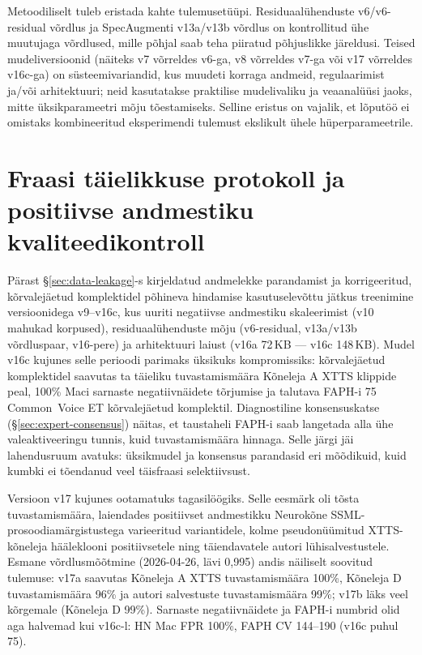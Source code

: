 Metoodiliselt tuleb eristada kahte tulemusetüüpi. Residuaalühenduste v6/v6-residual võrdlus ja SpecAugmenti v13a/v13b võrdlus on kontrollitud ühe muutujaga võrdlused, mille põhjal saab teha piiratud põhjuslikke järeldusi. Teised mudeliversioonid (näiteks v7 võrreldes v6-ga, v8 võrreldes v7-ga või v17 võrreldes v16c-ga) on süsteemivariandid, kus muudeti korraga andmeid, regulaarimist ja/või arhitektuuri; neid kasutatakse praktilise mudelivaliku ja veaanalüüsi jaoks, mitte üksikparameetri mõju tõestamiseks. Selline eristus on vajalik, et lõputöö ei omistaks kombineeritud eksperimendi tulemust ekslikult ühele hüperparameetrile.

\section{Fraasi täielikkuse protokoll ja positiivse andmestiku kvaliteedikontroll}
\label{sec:phrase-completeness-control}

Pärast §\ref{sec:data-leakage}-s kirjeldatud andmelekke parandamist ja korrigeeritud, kõrvalejäetud komplektidel põhineva hindamise kasutuselevõttu jätkus treenimine versioonidega v9--v16c, kus uuriti negatiivse andmestiku skaleerimist (v10 mahukad korpused), residuaalühenduste mõju (v6-residual, v13a/v13b võrdluspaar, v16-pere) ja arhitektuuri laiust (v16a 72\,KB --- v16c 148\,KB). Mudel v16c kujunes selle perioodi parimaks üksikuks kompromissiks: kõrvalejäetud komplektidel saavutas ta täieliku tuvastamismäära Kõneleja A XTTS klippide peal, 100\% Maci sarnaste negatiivnäidete tõrjumise ja talutava FAPH-i 75 Common~Voice ET kõrvalejäetud komplektil. Diagnostiline konsensuskatse (§\ref{sec:expert-consensus}) näitas, et taustaheli FAPH-i saab langetada alla ühe valeaktiveeringu tunnis, kuid tuvastamismäära hinnaga. Selle järgi jäi lahendusruum avatuks: üksikmudel ja konsensus parandasid eri mõõdikuid, kuid kumbki ei tõendanud veel täisfraasi selektiivsust.

Versioon v17 kujunes ootamatuks tagasilöögiks. Selle eesmärk oli tõsta tuvastamismäära, laiendades positiivset andmestikku Neurokõne SSML-prosoodiamärgistustega varieeritud variantidele, kolme pseudonüümitud XTTS-kõneleja hääleklooni positiivsetele ning täiendavatele autori lühisalvestustele. Esmane võrdlusmõõtmine (2026-04-26, lävi 0,995) andis näiliselt soovitud tulemuse: v17a saavutas Kõneleja A XTTS tuvastamismäära 100\%, Kõneleja D tuvastamismäära 96\% ja autori salvestuste tuvastamismäära 99\%; v17b läks veel kõrgemale (Kõneleja D 99\%). Sarnaste negatiivnäidete ja FAPH-i numbrid olid aga halvemad kui v16c-l: HN Mac FPR 100\%, FAPH CV 144--190 (v16c puhul 75).

